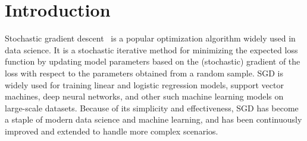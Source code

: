 \documentclass[11pt, reqno,english]{amsart}
\begin{document}
\begin{abstract}
\end{abstract}
\section{Introduction}


Stochastic gradient descent~\cite{robbins1951stochastic} is a popular optimization algorithm widely used in data science. It is a stochastic iterative method for minimizing the expected loss function by updating model parameters based on the (stochastic) gradient of the loss with respect to the parameters obtained from a random sample. SGD is widely used for training linear and logistic regression models, support vector machines, deep neural networks, and other such machine learning models on large-scale datasets. Because of its simplicity and effectiveness, SGD has become a staple of modern data science and machine learning, and has been continuously improved and extended to handle more complex scenarios. 
\end{document}
